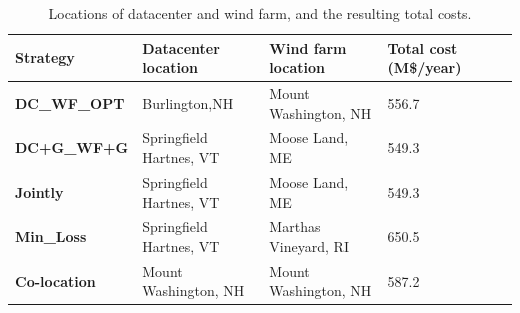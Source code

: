 \begin{table}[ht]
\begin{center}
\caption{Locations of datacenter and wind farm, and the resulting
  total costs.}
\begin{tabular}{|l|p{50pt}|p{50pt}|p{30pt}|p{20pt}|}
\hline
\textbf{Strategy}& \textbf{Datacenter location} &\textbf{Wind farm location} &\textbf{Total cost (M\$/year)}%
 \\
\hline
\textbf{DC\_WF\_OPT} &  Burlington,NH  & Mount Washington, NH & 556.7%
\\
\textbf{DC+G\_WF+G} &Springfield Hartnes, VT  & Moose Land, ME& 549.3%
\\
\textbf{Jointly} &Springfield Hartnes, VT&  Moose Land, ME & 549.3%
\\
\textbf{Min\_Loss} &Springfield Hartnes, VT & Marthas Vineyard, RI & 650.5%
\\
\textbf{Co-location}& Mount Washington, NH &Mount Washington, NH& 587.2%
\\
\hline
\end{tabular}
\label{tab:costsaving}
\end{center}
\vspace{-0.2in}
\end{table}

